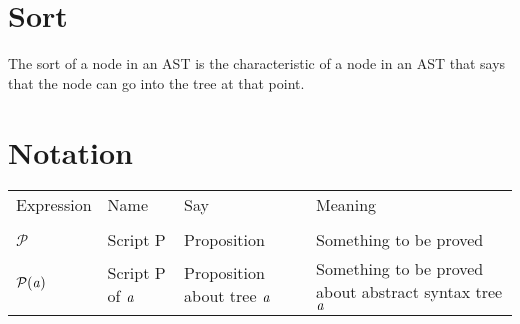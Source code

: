\documentclass[12pt]{article}
\begin{document}
\section*{Sort}
The sort of a node in an AST is the characteristic of a node in an AST that says that the node can go into 
the tree at that point.
\section*{Notation}
\begin{tabular}[b] {p{} p{} p{} p{}}
Expression & Name & Say & Meaning \\ \\
$\mathcal{P}$ & Script P & Proposition & Something to be proved \\
$\mathcal{P}(\it{a})$ & Script P of $\it{a}$ & Proposition about tree $\it{a}$ & Something to be proved about abstract syntax tree $\it{a}$


\end{tabular}
\end{document}
